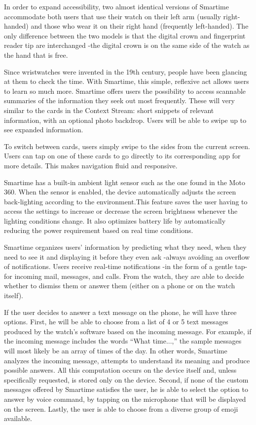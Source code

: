 \documentclass{article}
\begin{document}
In order to expand accessibility, two almost identical versions of Smartime accommodate both users that use their watch on their left arm (usually right-handed) and those who wear it on their right hand (frequently left-handed). The only difference between the two models is that the digital crown and fingerprint reader tip are interchanged -the digital crown is on the same side of the watch as the hand that is free.

Since wristwatches were invented in the 19th century, people have been glancing at them to check the time. With Smartime, this simple, reflexive act allows users to learn so much more. Smartime offers users the possibility to access scannable summaries of the information they seek out most frequently. These will very similar to the cards in the Context Stream: short snippets of relevant information, with an optional photo backdrop. Users will be able to swipe up to see expanded information.

 To switch between cards, users simply swipe to the sides from the current screen. Users can tap on one of these cards to go directly to its corresponding app for more details. This makes navigation fluid and responsive.

Smartime has a built-in ambient light sensor such as the one found in the Moto 360. When the sensor is enabled, the device automatically adjusts the screen back-lighting according to the environment.This feature saves the user having to access the settings to increase or decrease the screen brightness whenever the lighting conditions change. It also optimizes battery life by automatically reducing the power requirement based on real time conditions.
 
Smartime organizes users' information by predicting what they need, when they need to see it and displaying it before they even ask -always avoiding an overflow of notifications.  Users receive real-time notifications -in the form of a gentle tap- for incoming mail, messages, and calls. From the watch, they are able to decide whether to dismiss them or answer them (either on a phone or on the watch itself).

If the user decides to answer a text message on the phone, he will have three options. First, he will be able to choose from a list of 4 or 5 text messages produced by the watch's software based on the incoming message. For example, if the incoming message includes the words ``What time...,'' the sample messages will most likely be an array of times of the day. In other words, Smartime analyzes the incoming message, attempts to understand its meaning and produce possible answers. All this computation occurs on the device itself and, unless specifically requested, is stored only on the device.  Second, if none of the custom messages offered by Smartime satisfies the user, he is able to select the option to answer by voice command, by tapping on the microphone that will be displayed on the screen. Lastly, the user is able to choose from a diverse group of emoji available.
 
\end{document}
